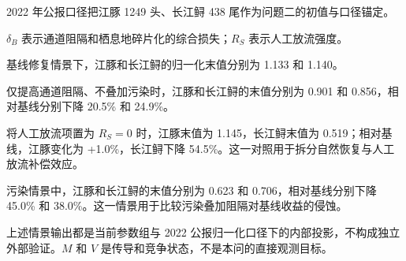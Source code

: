 2022 年公报口径把江豚 1249 头、长江鲟 438 尾作为问题二的初值与口径锚定。

\(\delta_B\) 表示通道阻隔和栖息地碎片化的综合损失；\(R_S\) 表示人工放流强度。

基线修复情景下，江豚和长江鲟的归一化末值分别为 1.133 和 1.140。

仅提高通道阻隔、不叠加污染时，江豚和长江鲟的末值分别为 0.901 和 0.856，相对基线分别下降 20.5\% 和 24.9\%。

将人工放流项置为 \(R_S=0\) 时，江豚末值为 1.145，长江鲟末值为 0.519；相对基线，江豚变化为 +1.0\%，长江鲟下降 54.5\%。这一对照用于拆分自然恢复与人工放流补偿效应。

污染情景中，江豚和长江鲟的末值分别为 0.623 和 0.706，相对基线分别下降 45.0\% 和 38.0\%。这一情景用于比较污染叠加阻隔对基线收益的侵蚀。

上述情景输出都是当前参数组与 2022 公报归一化口径下的内部投影，不构成独立外部验证。\(M\) 和 \(V\) 是传导和竞争状态，不是本问的直接观测目标。

